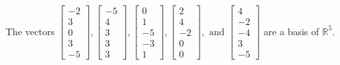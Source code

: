 \begin{exercise}
\begin{exerciseStatement}
  \end{exerciseStatement}
  \begin{exerciseAnswer}
   The vectors \(\left[\begin{array}{r}
-2 \\
3 \\
0 \\
3 \\
-5
\end{array}\right] , \left[\begin{array}{r}
-5 \\
4 \\
3 \\
3 \\
3
\end{array}\right] , \left[\begin{array}{r}
0 \\
1 \\
-5 \\
-3 \\
1
\end{array}\right] , \left[\begin{array}{r}
2 \\
4 \\
-2 \\
0 \\
0
\end{array}\right] , \text{ and } \left[\begin{array}{r}
4 \\
-2 \\
-4 \\
3 \\
-5
\end{array}\right]\) 
  	 are  a basis of \(\mathbb{R}^5\).
  


  \end{exerciseAnswer}
\end{exercise}